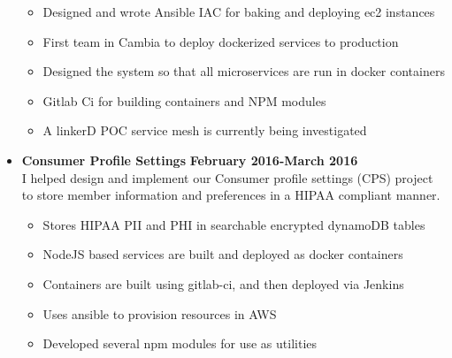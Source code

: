 \documentclass[overlapped]{res}
\begin{document}
\begin{resume}
\begin{itemize}[leftmargin=0in]
\begin{samepage}
                \begin{itemize}
                    \item[\textbullet] Designed and wrote Ansible IAC for baking and deploying ec2 instances
                    \item[\textbullet] First team in Cambia to deploy dockerized services to production
                    \item[\textbullet] Designed the system so that all microservices are run in docker containers
                    \item[\textbullet] Gitlab Ci for building containers and NPM modules
                    \item[\textbullet] A linkerD POC service mesh is currently being investigated
                \end{itemize}
            \end{samepage}
            \vspace{0.125in}
        \item[] 
            \begin{samepage}
                \textbf{Consumer Profile Settings} \hfill \textbf{February 2016-March 2016} \\
                I helped design and implement our Consumer profile settings (CPS) project to store member information and preferences in a HIPAA compliant manner.
                \begin{itemize}
                    \item[\textbullet] Stores HIPAA PII and PHI in searchable encrypted dynamoDB tables
                    \item[\textbullet] NodeJS based services are built and deployed as docker containers
                    \item[\textbullet] Containers are built using gitlab-ci, and then deployed via Jenkins
                    \item[\textbullet] Uses ansible to provision resources in AWS
                    \item[\textbullet] Developed several npm modules for use as utilities
                \end{itemize}
            \end{samepage}
            \vspace{0.125in}
\end{itemize}
\vspace{0.25in}


\end{resume}
\end{document}
